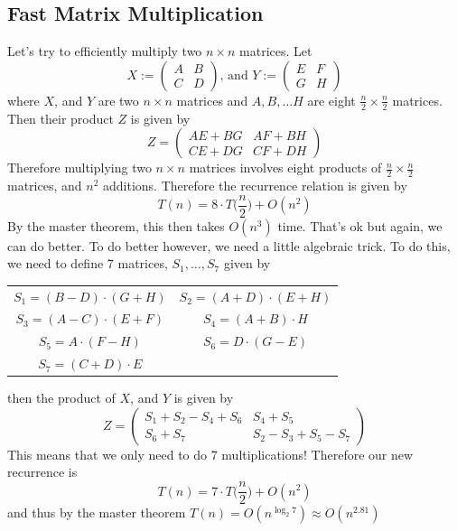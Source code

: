 \documentclass{article}
\newcommand{\x}{\cdot}
\newcommand{\ds}{\displaystyle}
\begin{document}
\subsection{Fast Matrix Multiplication}
Let's try to efficiently multiply two $n \times n$ matrices. Let
\[X :=
\begin{pmatrix}
A & B\\
C & D
\end{pmatrix}
\text{, and } Y :=
\begin{pmatrix}
E & F\\
G & H
\end{pmatrix}
\]
where $X$, and $Y$ are two $n \times n$ matrices and $A, B, \dots H$ are eight $\ds \frac{n}{2} \times \frac{n}{2}$ matrices. Then their product $Z$ is given by
\[
Z =
\begin{pmatrix}
AE + BG & AF + BH\\
CE + DG & CF + DH
\end{pmatrix}
\]
Therefore multiplying two $n \times n$ matrices involves eight products of $\ds \frac{n}{2} \times \frac{n}{2}$ matrices, and $n^2$ additions. Therefore the recurrence relation is given by
\[T(n) = 8\x T\Big(\frac{n}{2}\Big) + O(n^2)\]
By the master theorem, this then takes $O(n^3)$ time. That's ok but again, we can do better. To do better however, we need a little algebraic trick. To do this, we need to define 7 matrices, $S_1, \dots, S_7$ given by
\begin{center}
\begin{tabular}{c c}
$S_1 = (B-D)\x(G+H)$ & $S_2 = (A+D)\x(E+H)$\\
$S_3 = (A-C)\x(E+F)$ & $S_4 = (A+B)\x H$\\
$S_5 = A\x (F-H)$ & $S_6 = D\x (G-E)$\\
$S_7 = (C+D)\x E$
\end{tabular}
\end{center}
then the product of $X$, and $Y$ is given by
\[Z =
\begin{pmatrix}
S_1 + S_2 - S_4 + S_6 & S_4 + S_5\\
S_6 + S_7 & S_2 - S_3 + S_5 - S_7
\end{pmatrix}
\]
This means that we only need to do 7 multiplications! Therefore our new recurrence is
\[T(n) = 7\x T\Big(\frac{n}{2}\Big) + O(n^2)\]
and thus by the master theorem $T(n) = O(n^{\log_2 7}) \approx O(n^{2.81})$
\end{document}
